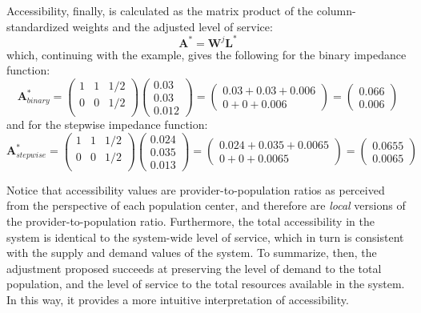 \documentclass[10pt,letterpaper]{article}
\begin{document}
Accessibility, finally, is calculated as the matrix product of the
column-standardized weights and the adjusted level of service: \[
\mathbf{A}^*=\mathbf{W}^{j}\mathbf{L}^*
\] which, continuing with the example, gives the following for the
binary impedance function: \[
\mathbf{A}^*_{binary} = 
\left(\begin{array}{ccc}
            1 & 1 & 1/2\\
            0 & 0 & 1/2\\
        \end{array}
        \right)
\left( \begin{array}{c}
0.03\\
0.03\\
0.012
\end{array} \right) =
\left( \begin{array}{c}
0.03 + 0.03 + 0.006\\
0 + 0 + 0.006
\end{array} \right)=
\left( \begin{array}{c}
0.066\\
0.006
\end{array} \right)
\] and for the stepwise impedance function: \[
\mathbf{A}^*_{stepwise} = 
\left(\begin{array}{ccc}
            1 & 1 & 1/2\\
            0 & 0 & 1/2\\
        \end{array}
        \right)
\left( \begin{array}{c}
0.024\\
0.035\\
0.013
\end{array} \right) =
\left( \begin{array}{c}
0.024 + 0.035 + 0.0065\\
0 + 0 + 0.0065
\end{array} \right)=
\left( \begin{array}{c}
0.0655\\
0.0065
\end{array} \right)
\]

Notice that accessibility values are provider-to-population ratios as
perceived from the perspective of each population center, and therefore
are \emph{local} versions of the provider-to-population ratio.
Furthermore, the total accessibility in the system is identical to the
system-wide level of service, which in turn is consistent with the
supply and demand values of the system. To summarize, then, the
adjustment proposed succeeds at preserving the level of demand to the
total population, and the level of service to the total resources
available in the system. In this way, it provides a more intuitive
interpretation of accessibility.
\end{document}
